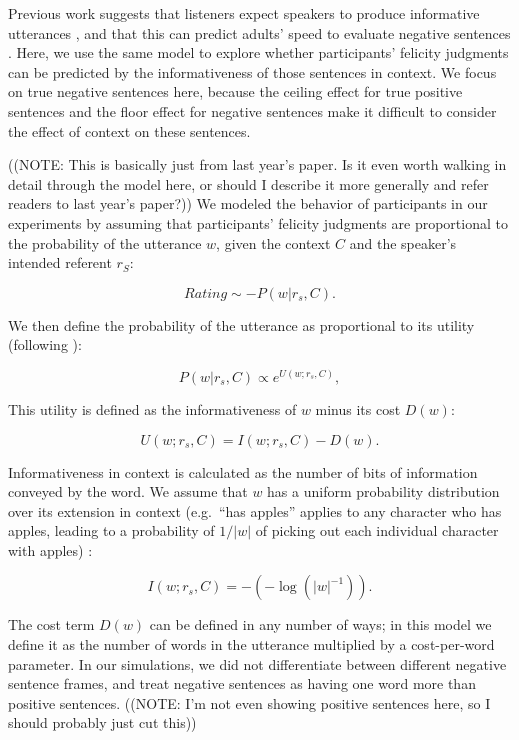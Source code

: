 \documentclass[10pt,letterpaper]{article}
\begin{document}
Previous work suggests that listeners expect speakers to produce informative utterances \cite{frank2012}, and that this can predict adults' speed to evaluate negative sentences \cite{nordmeyer2013}.  Here, we use the same model to explore whether participants' felicity judgments can be predicted by the informativeness of those sentences in context.  We focus on true negative sentences here, because the ceiling effect for true positive sentences and the floor effect for negative sentences make it difficult to consider the effect of context on these sentences.  

((NOTE: This is basically just from last year's paper.  Is it even worth walking in detail through the model here, or should I describe it more generally and refer readers to last year's paper?))
We modeled the behavior of participants in our experiments by assuming that participants' felicity judgments are proportional to the probability of the utterance $w$, given the context $C$ and the speaker's intended referent $r_S$:

\begin{equation}\label{eq:surprise}
Rating \sim -P(w| r_s, C).
\end{equation}

\noindent We then define the probability of the utterance as proportional to its utility (following ):

\begin{equation}\label{eq:pw1}
P(w | r_s, C) \propto  e^{U(w;r_s,C)},
\end{equation} 

\noindent This utility is defined as the informativeness of $w$ minus its cost $D(w)$:

\begin{equation}\label{eq:utility}
U(w;r_s,C) = I(w;r_s, C) - D(w).
\end{equation}

\noindent Informativeness in context is calculated as the number of bits of information conveyed by the word. We assume that $w$ has a uniform probability distribution over its extension in context (e.g.\ ``has apples'' applies to any character who has apples, leading to a probability of $1/|w|$ of picking out each individual character with apples) :

\begin{equation}\label{eq:info}
I(w;r_s, C) = -(-\log(|w|^{-1})).
\end{equation}

\noindent The cost term $D(w)$ can be defined in any number of ways; in this model we define it as the number of words in the utterance multiplied by a cost-per-word parameter.  In our simulations, we did not differentiate between different negative sentence frames, and treat negative sentences as having one word more than positive sentences.  ((NOTE: I'm not even showing positive sentences here, so I should probably just cut this))
\end{document}
